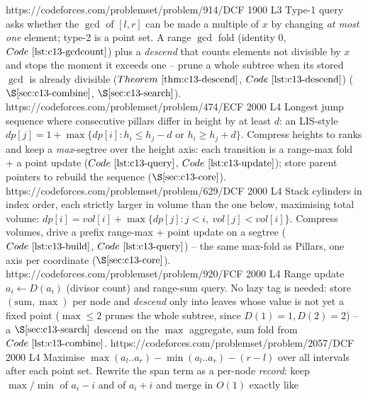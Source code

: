 \begin{mixedset}
    {https://codeforces.com/problemset/problem/914/D}{CF 1900 L3}
    {Type-1 query asks whether the \(\gcd\) of \([l,r]\) can be made a multiple of
     \(x\) by changing \emph{at most one} element; type-2 is a point set. A range
     \(\gcd\) fold (identity \(0\), \(\coderef{c13-gcdcount}\)) plus a
     \emph{descend} that counts elements not divisible by \(x\) and stops the moment
     it exceeds one -- prune a whole subtree when its stored \(\gcd\) is already
     divisible (\(\thmref{c13-descend}\), \(\coderef{c13-descend}\)) (\(\secref{c13-combine}\), \(\secref{c13-search}\)).}
    {https://codeforces.com/problemset/problem/474/E}{CF 2000 L4}
    {Longest jump sequence where consecutive pillars differ in height by at least
     \(d\): an LIS-style \(\mathit{dp}[j]=1+\max\{\mathit{dp}[i]:h_i\le h_j-d\) or
     \(h_i\ge h_j{+}d\}\). Compress heights to ranks and keep a \emph{max}-segtree over
     the height axis: each transition is a range-max fold + a point update
     (\(\coderef{c13-query}\), \(\coderef{c13-update}\)); store parent pointers to
     rebuild the sequence (\(\secref{c13-core}\)).}
    {https://codeforces.com/problemset/problem/629/D}{CF 2000 L4}
    {Stack cylinders in index order, each strictly larger in volume than the one
     below, maximising total volume: \(\mathit{dp}[i]=\mathit{vol}[i]+\max\{\mathit{dp}[j]:j<i,\ \mathit{vol}[j]<\mathit{vol}[i]\}\).
     Compress volumes, drive a prefix range-max + point update on a segtree
     (\(\coderef{c13-build}\), \(\coderef{c13-query}\)) -- the same max-fold as
     Pillars, one axis per coordinate (\(\secref{c13-core}\)).}
    {https://codeforces.com/problemset/problem/920/F}{CF 2000 L4}
    {Range update \(a_i\leftarrow D(a_i)\) (divisor count) and range-sum query. No
     lazy tag is needed: store \((\text{sum},\max)\) per node and \emph{descend} only
     into leaves whose value is not yet a fixed point (\(\max\le2\) prunes the whole
     subtree, since \(D(1){=}1,D(2){=}2\)) -- a \(\secref{c13-search}\) descend on the
     \(\max\) aggregate, sum fold from \(\coderef{c13-combine}\).}
    {https://codeforces.com/problemset/problem/2057/D}{CF 2000 L4}
    {Maximise \(\max(a_l..a_r)-\min(a_l..a_r)-(r-l)\) over all intervals after each
     point set. Rewrite the span term as a per-node \emph{record}: keep
     \(\max/\min\) of \(a_i-i\) and of \(a_i+i\) and merge in \(O(1)\) exactly like
}
\end{mixedset}
